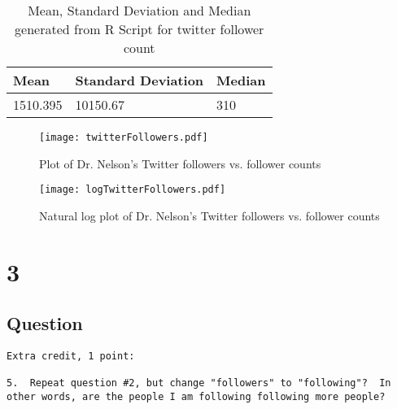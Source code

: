 \documentclass[letterpaper,11pt]{article}
\newcommand*{\srcPath}{../src}%
\begin{document}
\begin{table}[htb]
\centering
\begin{tabular}{ | l | l | l |}
\hline
\textbf{Mean} & \textbf{Standard Deviation} & \textbf{Median} \\
\hline
1510.395 & 10150.67 & 310 \\
\hline
\end{tabular}
\caption{Mean, Standard Deviation and Median generated from R Script for twitter follower count}
\label{table:q2summary}
\end{table}



\begin{figure}[h]
\centering
\texttt{[image: twitterFollowers.pdf]}
\caption{Plot of Dr. Nelson's Twitter followers vs. follower counts}
\label{fig:q2followers}
\end{figure}

\begin{figure}[h]
\centering
\texttt{[image: logTwitterFollowers.pdf]}
\caption{Natural log plot of Dr. Nelson's Twitter followers vs. follower counts}
\label{fig:q2logfollowers}
\end{figure}




\clearpage


\section*{3}

\subsection*{Question}

\begin{verbatim}
Extra credit, 1 point:

5.  Repeat question #2, but change "followers" to "following"?  In
other words, are the people I am following following more people?
\end{verbatim}
\end{document}
